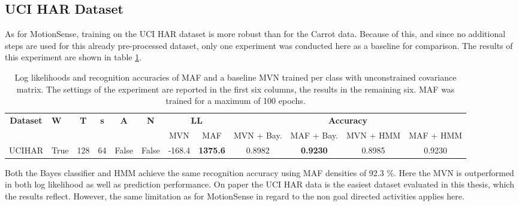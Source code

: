 \documentclass[11pt,titlepage,oneside,openany]{book}
\begin{document}
\subsection{UCI HAR Dataset}
As for MotionSense, training on the UCI HAR dataset is more robust than for the Carrot data. Because of this, and since no additional steps are used for this already pre-processed dataset, only one experiment was conducted here as a baseline for comparison. The results of this experiment are shown in table \ref{tab:uci}.

\begin{table}[H]
	\centering
	\tiny
	\begin{tabular}{c l c c c c c c c c c c}
		\toprule
		\multirow{2}{*}{\bfseries Dataset} & 
		\multirow{2}{*}{\bfseries W} & 
		\multirow{2}{*}{\bfseries T} &
		\multirow{2}{*}{\bfseries s} &
		\multirow{2}{*}{\bfseries A} &
		\multirow{2}{*}{\bfseries N} &
		\multicolumn{2}{c}{\bfseries LL} & 
		\multicolumn{4}{c}{\bfseries Accuracy}\\
		\cmidrule(lr){7-8}
		\cmidrule(lr){9-12}
		& & & & & & MVN & MAF & MVN + Bay. & MAF + Bay. & MVN + HMM & MAF + HMM \\
		\cmidrule(lr){1-12}
		UCIHAR &    True &     128 &      64 &    False &  False & -168.4 & \textbf{1375.6} &   0.8982 &   \textbf{0.9230} &   0.8985 &   0.9230 \\
		\bottomrule
	\end{tabular}
	\caption[Evaluation results UCI HAR, long]{\label{tab:uci} Log likelihoods and recognition accuracies of MAF and a baseline MVN trained per class with unconstrained covariance matrix. The settings of the experiment are reported in the first six columns, the results in the remaining six. MAF was trained for a maximum of 100 epochs.}
\end{table}

\noindent Both the Bayes classifier and HMM achieve the same recognition accuracy using MAF densities of 92.3 \%. Here the MVN is outperformed in both log likelihood as well as prediction performance. On paper the UCI HAR data is the easiest dataset evaluated in this thesis, which the results reflect. However, the same limitation as for MotionSense in regard to the non goal directed activities applies here.
\end{document}
